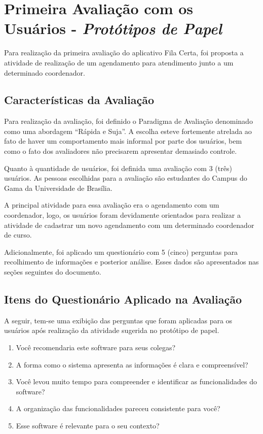 	\section[Primeira Avaliação com os Usuários - Protótipos de Papel]{Primeira Avaliação com os Usuários - \emph{Protótipos de Papel}}
	\label{sec:avaliacaoPrototipos_Primeira}

		Para realização da primeira avaliação do aplicativo Fila Certa, foi proposta a atividade de realização de um agendamento para atendimento junto a um determinado coordenador.

		\subsection[Características da Avaliação]{Características da Avaliação}
		\label{sec:primeiraAvaliacao_Caracteristicas}

			Para realização da avaliação, foi definido o Paradigma de Avaliação denominado como uma abordagem “Rápida e Suja”. A escolha esteve fortemente atrelada ao fato de haver um comportamento mais informal por parte dos usuários, bem como o fato dos avaliadores não precisarem apresentar demasiado controle.

			Quanto à quantidade de usuários, foi definida uma avaliação com 3 (três) usuários. As pessoas escolhidas para a avaliação são estudantes do Campus do Gama da Universidade de Brasília.

			A principal atividade para essa avaliação era o agendamento com um coordenador, logo, os usuários foram devidamente orientados para realizar a atividade de cadastrar um novo agendamento com um determinado coordenador de curso.

			Adicionalmente, foi aplicado um questionário com 5 (cinco) perguntas para recolhimento de informações e posterior análise. Esses dados são apresentados nas seções seguintes do documento.

		\subsection[Itens do Questionário Aplicados na Avaliação]{Itens do Questionário Aplicado na Avaliação}
		\label{sec:primeiraAvaliacao_Questionario}

			A seguir, tem-se uma exibição das perguntas que foram aplicadas para os usuários após realização da atividade sugerida no protótipo de papel.

			\begin{enumerate}
				\item{Você recomendaria este software para seus colegas?}
				\item{A forma como o sistema apresenta as informações é clara e compreensível?}
				\item{Você levou muito tempo para compreender e identificar as funcionalidades do software?}
				\item{A organização das funcionalidades pareceu consistente para você?}
				\item{Esse software é relevante para o seu contexto?}
			\end{enumerate}

